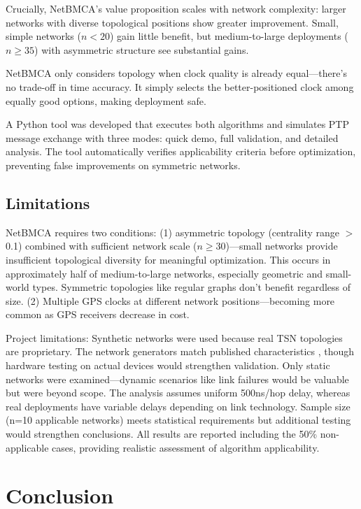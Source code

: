 \documentclass[conference]{IEEEtran}
\begin{document}
Crucially, NetBMCA's value proposition scales with network complexity: larger networks with diverse topological positions show greater improvement. Small, simple networks ($n<20$) gain little benefit, but medium-to-large deployments ($n \geq 35$) with asymmetric structure see substantial gains.

NetBMCA only considers topology when clock quality is already equal---there's no trade-off in time accuracy. It simply selects the better-positioned clock among equally good options, making deployment safe.

A Python tool was developed that executes both algorithms and simulates PTP message exchange with three modes: quick demo, full validation, and detailed analysis. The tool automatically verifies applicability criteria before optimization, preventing false improvements on symmetric networks.

\subsection{Limitations}

NetBMCA requires two conditions: (1) asymmetric topology (centrality range $>$0.1) combined with sufficient network scale ($n \geq 30$)---small networks provide insufficient topological diversity for meaningful optimization. This occurs in approximately half of medium-to-large networks, especially geometric and small-world types. Symmetric topologies like regular graphs don't benefit regardless of size. (2) Multiple GPS clocks at different network positions---becoming more common as GPS receivers decrease in cost.

Project limitations: Synthetic networks were used because real TSN topologies are proprietary. The network generators match published characteristics \cite{topology-zoo}, though hardware testing on actual devices would strengthen validation. Only static networks were examined---dynamic scenarios like link failures would be valuable but were beyond scope. The analysis assumes uniform 500ns/hop delay, whereas real deployments have variable delays depending on link technology. Sample size (n=10 applicable networks) meets statistical requirements but additional testing would strengthen conclusions. All results are reported including the 50\% non-applicable cases, providing realistic assessment of algorithm applicability.

\section{Conclusion}
\end{document}
